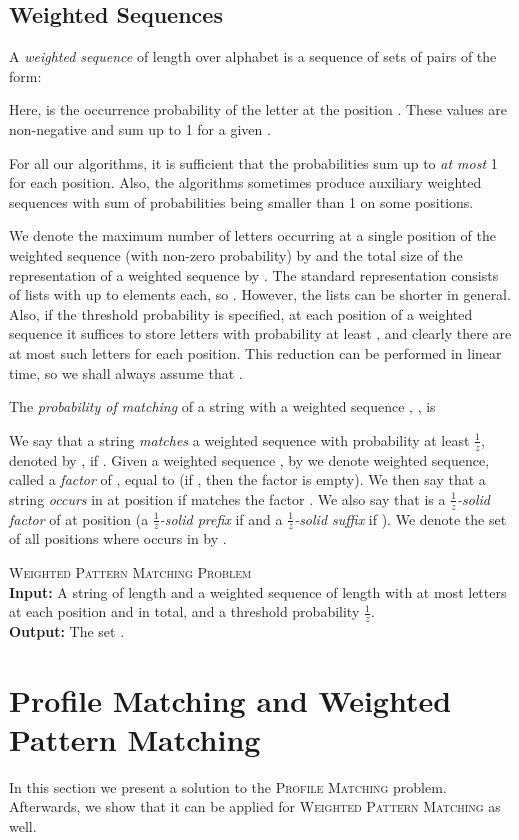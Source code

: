 \documentclass{article}
\theoremstyle{plain}
\theoremstyle{definition}
\newenvironment{dsproblem}[1]
{\begin{center}\begin{lrbox}{\mybox}\begin{minipage}{0.96\columnwidth}#1 \textsc{Problem}\\}
{\end{minipage}\end{lrbox}\fbox{\usebox{\mybox}}\end{center}}
\newcommand{\defdsproblem}[3]{
  \begin{dsproblem}{#1}
\textbf{Input:} #2\\
\textbf{Output:} #3
  \end{dsproblem}
  }
\newcommand{\PM}{\textsc{Profile Matching}\xspace}
\newcommand{\WPM}{\textsc{Weighted Pattern Matching}\xspace}
\newcommand{\fr}{\ensuremath{\frac1z}}
\begin{document}
    \subsection{Weighted Sequences}
    A \emph{weighted sequence}  of length  over alphabet 
    is a sequence of sets of pairs of the form:
    
    Here,  is the occurrence probability of the letter  at the position .
    These values are non-negative and sum up to 1 for a given .
 
    For all our algorithms, it is sufficient that the probabilities sum up to \emph{at most} 1 for each position.
    Also, the algorithms sometimes produce auxiliary weighted sequences with sum of probabilities being smaller than 1 on some positions.

    We denote the maximum number of letters occurring at a single position of the weighted sequence
    (with non-zero probability) by 
    and the total size of the representation of a weighted sequence by .
    The standard representation consists of  lists with up to  elements each,
    so .   However, the lists can be shorter in general.
    Also, if the threshold probability  is specified, at each position of a weighted sequence
    it suffices to store letters with probability at least , and clearly
    there are at most  such letters for each position. This reduction can be performed in linear time, so we shall always assume
    that .
        


    The \emph{probability of matching} of a string  with a weighted sequence , , is 
    
    We say that a string  \emph{matches} a weighted sequence 
    with probability at least \fr, denoted by , if .
    Given a weighted sequence , by  we denote weighted sequence,
    called a \emph{factor} of , equal to  (if , then the factor is empty).
    We then say that a string  \emph{occurs} in  at position  if  matches the factor .
    We also say that  is a \emph{\fr-solid factor} of  at position  (a \emph{\fr-solid prefix} if 
    and a \emph{\fr-solid suffix} if ).
    We denote the set of all positions where  occurs in  by .

    \defdsproblem{\WPM}{
      A string  of length  and a weighted sequence  of length  with at most  letters at each position
      and  in total, and a threshold probability \fr.
    }{
      The set .
    }




  \section{Profile Matching and Weighted Pattern Matching}\label{sec:EWPM}
    In this section we present a solution to the \PM problem.
    Afterwards, we show that it can be applied for \WPM as well.
\end{document}
